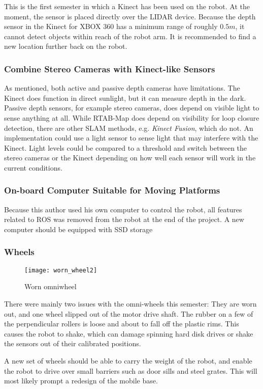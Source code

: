 This is the first semester in which a Kinect has been used on the robot. At the moment, the sensor is placed directly over the \ac{LIDAR} device. Because the depth sensor in the Kinect for XBOX 360 has a minimum range of roughly $0.5 m$, it cannot detect objects within reach of the robot arm. It is recommended to find a new location further back on the robot. 

\subsubsection{Combine Stereo Cameras with Kinect-like Sensors}

As mentioned, both active and passive depth cameras have limitations. The Kinect does function in direct sunlight, but it can measure depth in the dark. Passive depth sensors, for example stereo cameras, does depend on visible light to sense anything at all. While RTAB-Map does depend on visibility for loop closure detection, there are  other \ac{SLAM} methods, e.g. \textit{Kinect Fusion}, which do not. An implementation could use a light sensor to sense light that may interfere with the Kinect. Light levels could be compared to a threshold and switch between the stereo cameras or the Kinect depending on how well each sensor will work in the current conditions. 

\subsubsection{On-board Computer Suitable for Moving Platforms}

Because this author used his own computer to control the robot, all features related to \ac{ROS} was removed from the robot at the end of the project. A new computer should be equipped with \ac{SSD} storage

\subsubsection{Wheels}

\begin{wrapfigure}{r}{0.5\textwidth}
	\vspace{-20pt}
	\begin{center}
		\texttt{[image: worn\_wheel2]}
	\end{center}
	
	\caption{Worn omniwheel}
	\label{fig:worn_wheel}
\end{wrapfigure}

There were mainly two issues with the omni-wheels this semester: They are worn out, and one wheel slipped out of the motor drive shaft. The rubber on a few of the perpendicular rollers is loose and about to fall off the plastic rims. This causes the robot to shake, which can damage spinning hard disk drives or shake the sensors out of their calibrated positions.   

A new set of wheels should be able to carry the weight of the robot, and enable the robot to drive over small barriers such as door sills and steel grates. This will most likely prompt a redesign of the mobile base.